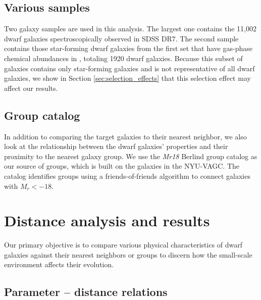 

\subsection{Various samples}


Two galaxy samples are used in this analysis.  The largest one contains the 
11,002 dwarf galaxies spectroscopically observed in SDSS DR7.  The second sample 
contains those star-forming dwarf galaxies from the first set that have 
gas-phase chemical abundances in \cite{Douglass17c}, totaling 1920 dwarf 
galaxies.  Because this subset of galaxies contains only star-forming galaxies 
and is not representative of all dwarf galaxies, we show in Section 
\ref{sec:selection_effects} that this selection effect may affect our results.


\subsection{Group catalog}

In addition to comparing the target galaxies to their nearest neighbor, we also 
look at the relationship between the dwarf galaxies' properties and their 
proximity to the nearest galaxy group.  We use the \emph{Mr18} Berlind group 
catalog \citep{Berlind06} as our source of groups, which is built on the 
galaxies in the NYU-VAGC. The catalog identifies groups using a 
friends-of-friends algorithm \citep{Huchra82} to connect galaxies with 
$M_r < -18$.




\section[Analysis \& Results]{Distance analysis and results}

Our primary objective is to compare various physical characteristics of dwarf 
galaxies against their nearest neighbors or groups to discern how the 
small-scale environment affects their evolution.


\subsection{Parameter -- distance relations}\label{sec:Relations}

